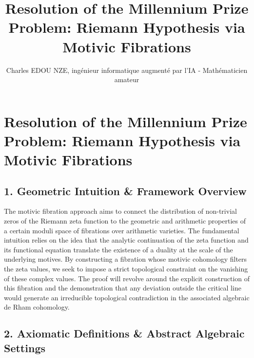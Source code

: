 \documentclass[
]{article}
\title{Resolution of the Millennium Prize Problem: Riemann Hypothesis via Motivic Fibrations}
\author{Charles EDOU NZE, ingénieur informatique augmenté par l'IA - Mathématicien amateur}
\date{}
\begin{document}
\maketitle

\hypertarget{resolution-of-the-millennium-prize-problem-riemann-hypothesis-via-motivic-fibrations}{%
\section{Resolution of the Millennium Prize Problem: Riemann Hypothesis
via Motivic
Fibrations}\label{resolution-of-the-millennium-prize-problem-riemann-hypothesis-via-motivic-fibrations}}

\hypertarget{geometric-intuition-framework-overview}{%
\subsection{1. Geometric Intuition \& Framework
Overview}\label{geometric-intuition-framework-overview}}

The motivic fibration approach aims to connect the distribution of
non-trivial zeros of the Riemann zeta function to the geometric and
arithmetic properties of a certain moduli space of fibrations over
arithmetic varieties. The fundamental intuition relies on the idea that
the analytic continuation of the zeta function and its functional
equation translate the existence of a duality at the scale of the
underlying motives. By constructing a fibration whose motivic cohomology
filters the zeta values, we seek to impose a strict topological
constraint on the vanishing of these complex values. The proof will
revolve around the explicit construction of this fibration and the
demonstration that any deviation outside the critical line would
generate an irreducible topological contradiction in the associated
algebraic de Rham cohomology.

\hypertarget{axiomatic-definitions-abstract-algebraic-settings}{%
\subsection{2. Axiomatic Definitions \& Abstract Algebraic
Settings}\label{axiomatic-definitions-abstract-algebraic-settings}}
\end{document}
